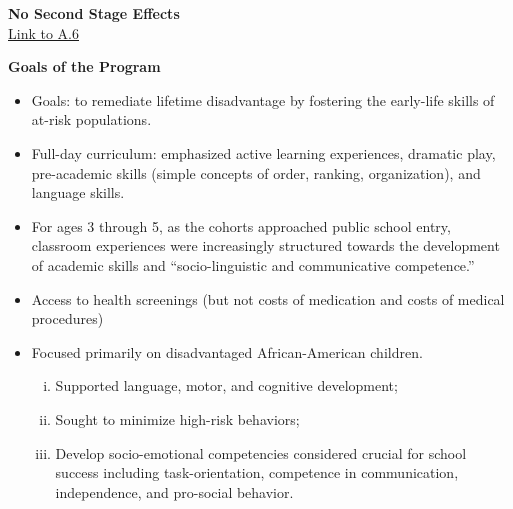 \documentclass[static]{JJH-Beamer}
\begin{document}
\begin{frame}

\hypertarget{ret:blowpop}{}
\begin{center}
\textbf{No Second Stage Effects}\\
\hyperlink{blowpop}{\underline{Link to A.6}}
\end{center}

\end{frame}

\begin{frame}

\begin{center}
\textbf{Goals of the Program}
\end{center}

\begin{itemize}
\item Goals: to remediate lifetime disadvantage by fostering the early-life skills of at-risk populations.
\item Full-day curriculum: emphasized active learning experiences, dramatic play, pre-academic skills (simple concepts of order, ranking, organization), and language skills.
\item For ages 3 through 5, as the cohorts approached public school entry, classroom experiences were increasingly structured towards the development of academic skills and ``socio-linguistic and communicative competence.''
\item Access to health screenings (but not costs of medication and costs of medical procedures)
\end{itemize}

\end{frame}


\begin{itemize}
\item Focused primarily on disadvantaged African-American children.
    \begin{enumerate}[(i)]
    \item Supported language, motor, and cognitive development;
    \item Sought to minimize high-risk behaviors;
    \item Develop socio-emotional competencies considered crucial for school success including task-orientation, competence in communication, independence, and pro-social behavior.
    \end{enumerate}
\end{itemize}
\end{document}
